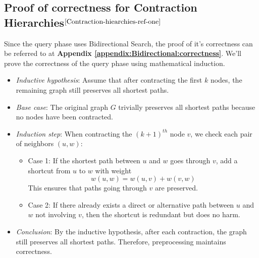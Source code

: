 \begin{appendices}
\section{Proof of correctness for Contraction Hierarchies$^{\cite{Contraction-hiearchies-ref-one}}$}\label{appendix:contraction:correctness}
	 Since the query phase uses Bidirectional Search, the proof of it's correctness can be referred to at \textbf{Appendix \ref{appendix:Bidirectional:correctness}}. We'll prove the correctness of the query phase using mathematical induction.
	\begin{itemize}
		\item \textit{Inductive hypothesis}: Assume that after contracting the first \(k\) nodes, the remaining graph still preserves all shortest paths.
		\item \textit{Base case}: The original graph \(G\) trivially preserves all shortest paths because no nodes have been contracted.
		\item \textit{Induction step}: 	When contracting the $(k+1)^{th}$ node \(v\), we check each pair of neighbors \((u, w)\):
		\begin{itemize}
			\item Case 1: If the shortest path between \(u\) and \(w\) goes through \(v\), add a shortcut from \(u\) to \(w\) with weight  
			\[ w(u, w) = w(u, v) + w(v, w) \]
			This ensures that paths going through \(v\) are preserved.
			\item Case 2: If there already exists a direct or alternative path between \(u\) and \(w\) not involving \(v\), then the shortcut is redundant but does no harm.
		\end{itemize}
		\item \textit{Conclusion}: By the inductive hypothesis, after each contraction, the graph still preserves all shortest paths. Therefore, preprocessing maintains correctness.
	\end{itemize}


\end{appendices}
